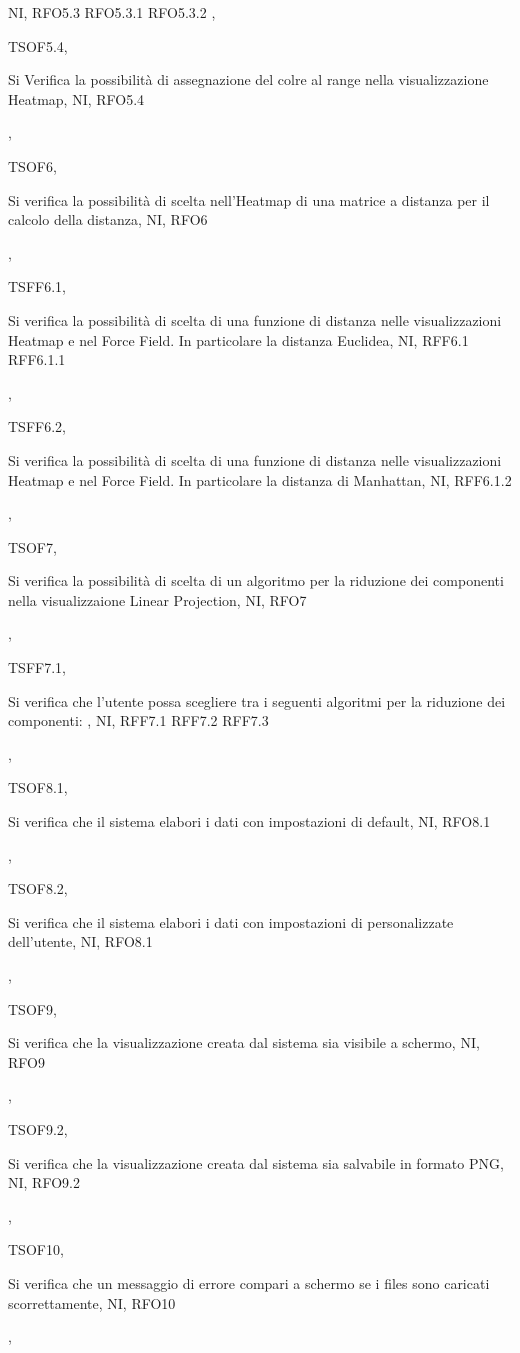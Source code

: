 {{        NI,
        RFO5.3 RFO5.3.1 RFO5.3.2
    },
    {   TSOF5.4,
        \raggedright Si Verifica la possibilità di assegnazione del colre al range nella visualizzazione Heatmap,
        NI,
        RFO5.4
    },
    {   TSOF6,
        \raggedright Si verifica la possibilità di scelta nell'Heatmap di una matrice a distanza per il calcolo della distanza,
        NI,
        RFO6
    },
    {   TSFF6.1,
        \raggedright Si verifica la possibilità di scelta di una funzione di distanza nelle visualizzazioni Heatmap e nel Force Field. In particolare la distanza Euclidea,
        NI,
        RFF6.1 RFF6.1.1
    },
    {   TSFF6.2,
        \raggedright Si verifica la possibilità di scelta di una funzione di distanza nelle visualizzazioni Heatmap e nel Force Field. In particolare la distanza di Manhattan,
        NI,
        RFF6.1.2
    },
    {   TSOF7,
        \raggedright Si verifica la possibilità di scelta di un algoritmo per la riduzione dei componenti nella visualizzaione Linear Projection,
        NI,
        RFO7
    },
    {   TSFF7.1,
        \raggedright Si verifica che l'utente possa scegliere tra i seguenti algoritmi per la riduzione dei componenti:
        ,
        NI,
        RFF7.1 RFF7.2 RFF7.3
    },
    {   TSOF8.1,
        \raggedright Si verifica che il sistema elabori i dati con impostazioni di default,
        NI,
        RFO8.1
    },
    {   TSOF8.2,
        \raggedright Si verifica che il sistema elabori i dati con impostazioni di personalizzate dell'utente,
        NI,
        RFO8.1
    },
    {   TSOF9,
        \raggedright Si verifica che la visualizzazione creata dal sistema sia visibile a schermo,
        NI,
        RFO9},
    {   TSOF9.2,
        \raggedright Si verifica che la visualizzazione creata dal sistema sia salvabile in formato PNG,
        NI,
        RFO9.2
    },
    {   TSOF10,
        \raggedright Si verifica che un messaggio di errore compari a schermo se i files sono caricati scorrettamente,
        NI,
        RFO10
    },
    }
    
    
